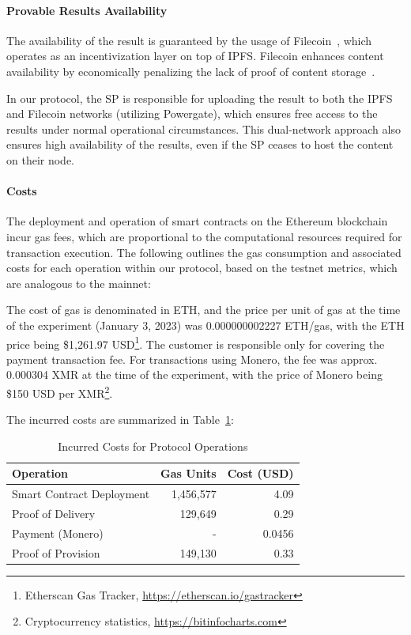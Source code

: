 \documentclass[pdftex,twocolumn,epjc3]{svjour3}
\begin{document}
\paragraph{Provable Results Availability}\label{sec:provable-results-availability}
The availability of the result is guaranteed by the usage of Filecoin~\cite{protocollabsFilecoinDecentralizedStorage2017}, which operates as an incentivization layer on top of IPFS. Filecoin enhances content availability by economically penalizing the lack of proof of content storage~\cite{filecoinSlashing}.

In our protocol, the SP is responsible for uploading the result to both the IPFS and Filecoin networks (utilizing Powergate), which ensures free access to the results under normal operational circumstances. This dual-network approach also ensures high availability of the results, even if the SP ceases to host the content on their node.

\paragraph{Costs}
The deployment and operation of smart contracts on the Ethereum blockchain incur gas fees, which are proportional to the computational resources required for transaction execution. The following outlines the gas consumption and associated costs for each operation within our protocol, based on the testnet metrics, which are analogous to the mainnet:

The cost of gas is denominated in ETH, and the price per unit of gas at the time of the experiment (January 3, 2023) was 0.000000002227 ETH/gas, with the ETH price being \$1,261.97 USD\footnote{Etherscan Gas Tracker, \url{https://etherscan.io/gastracker}}. The customer is responsible only for covering the payment transaction fee. For transactions using Monero, the fee was approx. 0.000304 XMR at the time of the experiment, with the price of Monero being \$150 USD per XMR\footnote{Cryptocurrency statistics, \url{https://bitinfocharts.com}}.

The incurred costs are summarized in Table~\ref{table:costs}:

\begin{table}
\caption{Incurred Costs for Protocol Operations}
\centering
\label{table:costs}
\begin{tabular}{lrr}
\hline
\textbf{Operation}            & \textbf{Gas Units} & \textbf{Cost (USD)} \\
\hline
Smart Contract Deployment     & 1,456,577          & 4.09                \\
Proof of Delivery             & 129,649            & 0.29                \\
Payment (Monero)              & -                  & 0.0456              \\
Proof of Provision            & 149,130            & 0.33                \\
\hline
\end{tabular}
\end{table}
\end{document}
